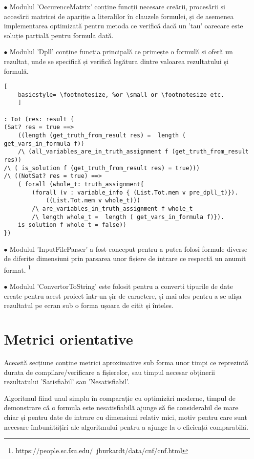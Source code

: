 $\bullet$ Modulul 'OccurenceMatrix' conține funcții necesare creării, procesării și accesării matricei de apariție a literalilor în clauzele formulei, și de asemenea implementarea optimizată pentru metoda ce verifică dacă un 'tau' oarecare este soluție parțială pentru formula dată.

$\bullet$ Modulul 'Dpll' conține funcția principală ce primește o formulă și oferă un \newline rezultat, unde se specifică și verifică legătura dintre valoarea rezultatului și formulă.

\begin{lstlisting}[
	basicstyle= \footnotesize, %or \small or \footnotesize etc.
	]

: Tot (res: result {
(Sat? res = true ==> 
	((length (get_truth_from_result res) = 	length ( get_vars_in_formula f)) 
	/\ (all_variables_are_in_truth_assignment f (get_truth_from_result res)) 
/\ ( is_solution f (get_truth_from_result res) = true)))
/\ ((NotSat? res = true) ==> 
	( forall (whole_t: truth_assignment{ 
		(forall (v : variable_info { (List.Tot.mem v pre_dpll_t)}). 
			((List.Tot.mem v whole_t)))
		/\ are_variables_in_truth_assignment f whole_t 
		/\ length whole_t =  length ( get_vars_in_formula f)}). 
	is_solution f whole_t = false))
})  

\end{lstlisting}

$\bullet$ Modulul 'InputFileParser' a fost conceput pentru a putea folosi formule diverse de diferite dimensiuni prin parsarea unor fișiere de intrare ce respectă un anumit format. \footnote{https://people.sc.fsu.edu/~jburkardt/data/cnf/cnf.html}

 $\bullet$ Modulul 'ConvertorToString' este folosit pentru a converti tipurile de date create pentru acest proiect într-un șir de caractere, și mai ales pentru a se afișa rezultatul pe ecran sub o forma ușoara de citit și înteles.


\section{Metrici orientative}

Această secțiune conține metrici aproximative sub forma unor timpi ce reprezintă durata de compilare/verificare a fișierelor, sau timpul necesar obținerii rezultatului 'Satisfiabil' sau 'Nesatisfiabil'.

Algoritmul fiind unul simplu în comparație cu optimizări moderne, timpul de demonstrare că o formula este nesatisfiabilă ajunge să fie considerabil de mare chiar și pentru date de intrare cu dimensiuni relativ mici, motiv pentru care sunt necesare îmbunătățiri ale algoritmului pentru a ajunge la o eficiență comparabilă.

